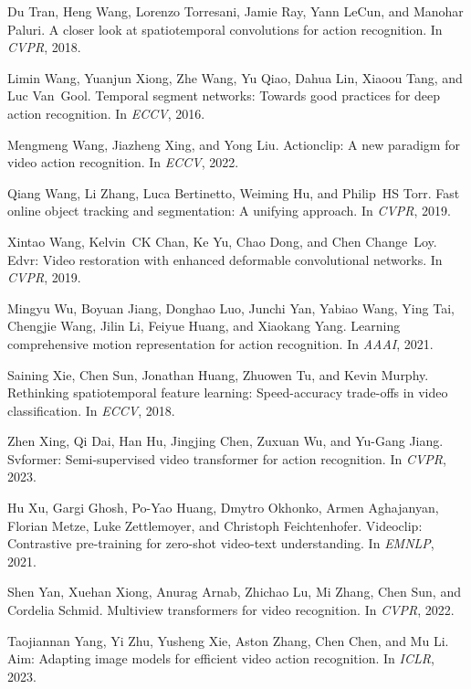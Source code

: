 \documentclass[10pt,twocolumn,letterpaper]{article}
\begin{document}
{\begin{thebibliography}{10}
Du Tran, Heng Wang, Lorenzo Torresani, Jamie Ray, Yann LeCun, and Manohar
  Paluri.
\newblock A closer look at spatiotemporal convolutions for action recognition.
\newblock In {\em CVPR}, 2018.

Limin Wang, Yuanjun Xiong, Zhe Wang, Yu Qiao, Dahua Lin, Xiaoou Tang, and Luc
  Van~Gool.
\newblock Temporal segment networks: Towards good practices for deep action
  recognition.
\newblock In {\em ECCV}, 2016.

Mengmeng Wang, Jiazheng Xing, and Yong Liu.
\newblock Actionclip: A new paradigm for video action recognition.
\newblock In {\em ECCV}, 2022.

Qiang Wang, Li Zhang, Luca Bertinetto, Weiming Hu, and Philip~HS Torr.
\newblock Fast online object tracking and segmentation: A unifying approach.
\newblock In {\em CVPR}, 2019.

Xintao Wang, Kelvin~CK Chan, Ke Yu, Chao Dong, and Chen Change~Loy.
\newblock Edvr: Video restoration with enhanced deformable convolutional
  networks.
\newblock In {\em CVPR}, 2019.

Mingyu Wu, Boyuan Jiang, Donghao Luo, Junchi Yan, Yabiao Wang, Ying Tai,
  Chengjie Wang, Jilin Li, Feiyue Huang, and Xiaokang Yang.
\newblock Learning comprehensive motion representation for action recognition.
\newblock In {\em AAAI}, 2021.

Saining Xie, Chen Sun, Jonathan Huang, Zhuowen Tu, and Kevin Murphy.
\newblock Rethinking spatiotemporal feature learning: Speed-accuracy trade-offs
  in video classification.
\newblock In {\em ECCV}, 2018.

Zhen Xing, Qi Dai, Han Hu, Jingjing Chen, Zuxuan Wu, and Yu-Gang Jiang.
\newblock Svformer: Semi-supervised video transformer for action recognition.
\newblock In {\em CVPR}, 2023.

Hu Xu, Gargi Ghosh, Po-Yao Huang, Dmytro Okhonko, Armen Aghajanyan, Florian
  Metze, Luke Zettlemoyer, and Christoph Feichtenhofer.
\newblock Videoclip: Contrastive pre-training for zero-shot video-text
  understanding.
\newblock In {\em EMNLP}, 2021.

Shen Yan, Xuehan Xiong, Anurag Arnab, Zhichao Lu, Mi Zhang, Chen Sun, and
  Cordelia Schmid.
\newblock Multiview transformers for video recognition.
\newblock In {\em CVPR}, 2022.

Taojiannan Yang, Yi Zhu, Yusheng Xie, Aston Zhang, Chen Chen, and Mu Li.
\newblock Aim: Adapting image models for efficient video action recognition.
\newblock In {\em ICLR}, 2023.


\end{thebibliography}}
\end{document}
